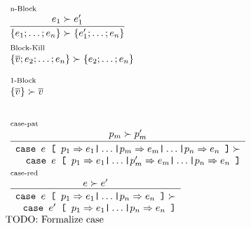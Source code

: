 \documentclass{standalone}
\begin{document}
$
\begin{array}{l}
  \begin{array}{l}{\scriptsize\text{n-Block}} \\ \infer{\{e_1 ; \dots ; e_n\} \succ \{e_1' ; \dots ; e_n\}}{e_1 \succ e_1'} \end{array} \\[1.5em]

  \begin{array}{l}{\scriptsize \text{Block-Kill}} \\ \{\overline{v} ; e_2 ; \dots ; e_n \} \succ \{ e_2 ; \dots ; e_n \} \end{array}\\[1.5em]

\begin{array}{l}{\scriptsize \text{1-Block}} \\ \{\overline{v} \} \succ \overline{v} \end{array} \\[1.5em]
\end{array}
$

$
\begin{array}{l}
  \begin{array}{l}{\scriptsize\text{case-pat}} \\ \infer{\begin{array}{r}
      \texttt{case }e\texttt{ [ }p_1 \Rightarrow e_1 \texttt{|} \dots \texttt{|}p_m\Rightarrow e_m\texttt{|}\dots\texttt{|}p_n\Rightarrow e_n \texttt{ ]}\succ \\ 
      \texttt{case }e\texttt{ [ } p_1\Rightarrow e_1 \texttt{|}\dots \texttt{|} p_m'\Rightarrow e_m\texttt{|}\dots\texttt{|}p_n\Rightarrow e_n \texttt{ ]}
  \end{array}}{p_m \succ p_m'}\end{array}\\[1.5em]

  \begin{array}{l}{\scriptsize\text{case-red}} \\ \infer{\begin{array}{r}
      \texttt{case }e\texttt{ [ }p_1\Rightarrow e_1 \texttt{|}\dots \texttt{|} p_n \Rightarrow e_n \texttt{ ]}\succ \\
      \texttt{case }e'\texttt{ [ }p_1\Rightarrow e_1 \texttt{|}\dots \texttt{|} p_n \Rightarrow e_n \texttt{ ]}\\
  \end{array}}{e \succ e'}\end{array} \\[1.5em]

  \text{TODO: Formalize case}
\end{array}
$
\end{document}
